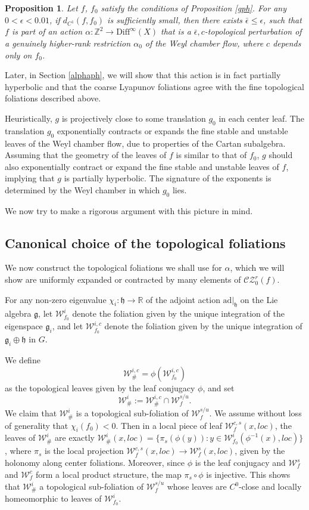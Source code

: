 \documentclass[11pt]{amsart}
\numberwithin{equation}{section}
\newcommand{\R}{\mathbb{R}}
\newcommand{\Z}{\mathbb{Z}}
\newcommand{\W}{\mathcal{W}}
\newcommand{\CZ}{\mathcal{CZ}}
\theoremstyle{plain}
\newtheorem{prop}[thm]{Proposition}
\begin{document}
\begin{prop}\label{ph} 
Let $f$, $f_0$ satisfy the conditions of Proposition \ref{gph}. For any $0<\epsilon<0.01$, if $d_{C^1}(f,f_0)$ is sufficiently small, then there exists $\bar \epsilon\le \epsilon$, such that $f$ is part of an action $\alpha:\Z^2 \to \mathrm{Diff}^\infty(X)$ that is a $\bar \epsilon,c$-topological perturbation of a genuinely higher-rank restriction $\alpha_0$ of the Weyl chamber flow, where $c$ depends only on $f_0$.
\end{prop}
\color{black}
Later, in Section \ref{alphaph}, we will show that this action is in fact partially hyperbolic and that the coarse Lyapunov foliations agree with the fine topological foliations described above.

Heuristically, $g$ is projectively close to some translation $g_0$ in each center leaf. The translation $g_0$ exponentially contracts or expands the fine stable and unstable leaves of the Weyl chamber flow, due to properties of the Cartan subalgebra. Assuming that the geometry of the leaves of $f$ is similar to that of $f_0$, $g$ should also exponentially contract or expand the fine stable and unstable leaves of $f$, implying that $g$ is partially hyperbolic. The signature of the exponents is determined by the Weyl chamber in which $g_0$ lies.

We now try to make a rigorous argument with this picture in mind.


\subsection{Canonical choice of the topological foliations}\label{sec:choicealphafolia}
We now construct the topological foliations we shall use for $\alpha$, which we will show are uniformly expanded or contracted by many elements of $\CZ^r_0(f)$.

For any non-zero eigenvalue $\chi_i:\mathfrak{h}\to \R$ of the adjoint action $\mathrm{ad}|_{\mathfrak{h}}$ on the Lie algebra $\mathfrak{g}$, let $\W^i_{f_0}$ denote the foliation given by the unique integration of the eigenspace $\mathfrak{g}_i$, and let $\W^{i,c}_{f_0}$ denote the foliation given by the unique integration of $\mathfrak{g}_i \oplus \mathfrak{h}$ in $G$. 

We define 
\[
\W^{i,c}_\# = \phi(\W^{i,c}_{f_0})
\] 
as the topological leaves given by the leaf conjugacy $\phi$, and set 
\[
\W^i_\# := \W^{i,c}_\# \cap \W^{s/u}_f.
\]
We claim that $\W^i_\#$ is a topological sub-foliation of $\W^{s/u}_f$. We assume without loss of generality that $\chi_i(f_0)<0$. Then in a local piece of leaf $\W^{c,s}_f(x,loc)$, the leaves of $\W^i_\#$ are exactly  $\W^i_\#(x,loc)=\{\pi_s(\phi(y)): y\in \W^i_{f_0}(\phi^{-1}(x),loc)\}$, where $\pi_s$ is the local projection $\W^{c,s}_f(x,loc)\to \W^{s}_f(x,loc)$, given by the holonomy along center foliations. Moreover, since $\phi$ is the leaf conjugacy and $\W^s_f$ and $\W^c_f$ form a local product structure, the map $\pi_s\circ \phi$ is injective. This shows that $\W^i_\#$ a topological sub-foliation of $\W^{s/u}_f$ whose leaves are $C^0$-close and locally homeomorphic to leaves of $\W^i_{f_0}$.
\end{document}
